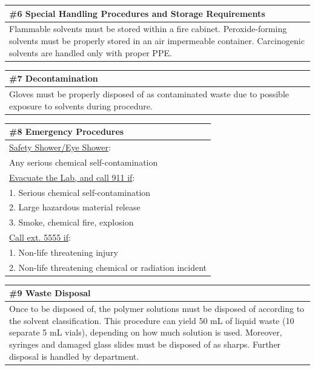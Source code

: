 \documentclass{article}
\begin{document}
\begin{center}
\begin{tabular}{ |p{\textwidth}| }
\hline
\cellcolor{gray!25} \#6 \textbf{Special Handling Procedures and Storage Requirements} \\
\hline
Flammable solvents must be stored within a fire cabinet. Peroxide-forming solvents must be properly stored in an air impermeable container. Carcinogenic solvents are handled only with proper PPE.
\\ \hline
\end{tabular}
\end{center}

\begin{center}
\begin{tabular}{ |p{\textwidth}| }
\hline
\cellcolor{gray!25} \#7 \textbf{Decontamination} \\
\hline
Gloves must be properly disposed of as contaminated waste due to possible exposure to solvents during procedure. 
\\ \hline
\end{tabular}
\end{center}

\begin{center}
\begin{tabular}{ |p{\textwidth}| }
\hline
\cellcolor{gray!25} \#8 \textbf{Emergency Procedures} \\
\hline
\underline{Safety Shower/Eye Shower}: \\
Any serious chemical self-contamination \\
\underline{Evacuate the Lab, and call 911 if}: \\
1. Serious chemical self-contamination \\
2. Large hazardous material release \\
3. Smoke, chemical fire, explosion \\
\underline{Call ext. 5555 if}: \\
1. Non-life threatening injury \\
2. Non-life threatening chemical or radiation incident   
\\ \hline
\end{tabular}
\end{center}

\begin{center}
\begin{tabular}{ |p{\textwidth}| }
\hline
\cellcolor{gray!25} \#9 \textbf{Waste Disposal} \\
\hline
Once to be disposed of, the polymer solutions must be disposed of according to the solvent classification. This procedure can yield 50 mL of liquid waste (10 separate 5 mL vials), depending on how much solution is used. Moreover, syringes and damaged glass slides must be disposed of as sharps. Further disposal is handled by department. 
\\ \hline
\end{tabular}
\end{center}
\end{document}
